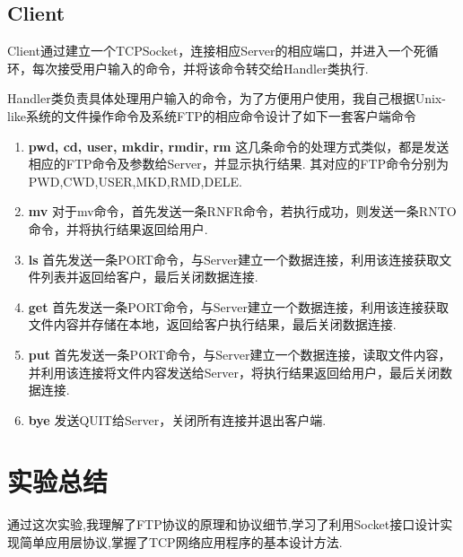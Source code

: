 \documentclass[a4paper,11pt]{article}
\begin{document}
\subsection{Client}
Client通过建立一个TCPSocket，连接相应Server的相应端口，并进入一个死循环，每次接受用户输入的命令，并将该命令转交给Handler类执行.

Handler类负责具体处理用户输入的命令，为了方便用户使用，我自己根据Unix-like系统的文件操作命令及系统FTP的相应命令设计了如下一套客户端命令
\begin{enumerate}
    \item \textbf{pwd, cd, user, mkdir, rmdir, rm}
        这几条命令的处理方式类似，都是发送相应的FTP命令及参数给Server，并显示执行结果.
        其对应的FTP命令分别为PWD,CWD,USER,MKD,RMD,DELE.
    \item \textbf{mv}
        对于mv命令，首先发送一条RNFR命令，若执行成功，则发送一条RNTO命令，并将执行结果返回给用户.
    \item \textbf{ls}
        首先发送一条PORT命令，与Server建立一个数据连接，利用该连接获取文件列表并返回给客户，最后关闭数据连接.
    \item \textbf{get}
        首先发送一条PORT命令，与Server建立一个数据连接，利用该连接获取文件内容并存储在本地，返回给客户执行结果，最后关闭数据连接.
    \item \textbf{put}
        首先发送一条PORT命令，与Server建立一个数据连接，读取文件内容，并利用该连接将文件内容发送给Server，将执行结果返回给用户，最后关闭数据连接.
    \item \textbf{bye}
        发送QUIT给Server，关闭所有连接并退出客户端.
\end{enumerate}
\section{实验总结}
通过这次实验,我理解了FTP协议的原理和协议细节,学习了利用Socket接口设计实现简单应用层协议,掌握了TCP网络应用程序的基本设计方法.
\end{document}
